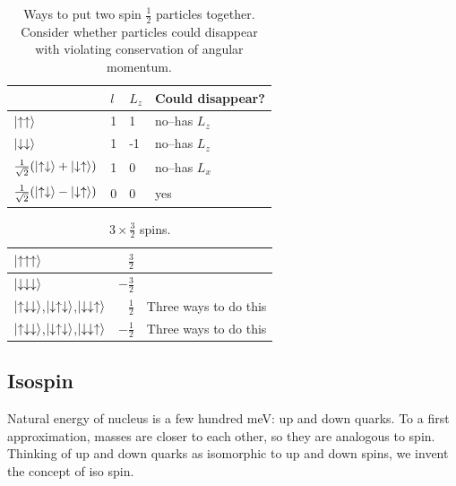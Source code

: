 \documentclass[]{article}
\begin{document}
\begin{table}[H]
	\begin{center}
		\caption[Ways to put two spin $\frac{1}{2}$ particles together]{Ways to put two spin $\frac{1}{2}$ particles together. Consider whether particles could disappear with violating conservation of angular momentum.}
		\begin{tabular}{|l|l|l|l|}\hline
			&$l$&$L_z$&Could disappear?\\ \hline
			$\ket{\uparrow\uparrow}$ &1&1&no--has $L_z$\\ \hline
			$\ket{\downarrow\downarrow}$&1&-1&no--has $L_z$ \\ \hline
			$\frac{1}{\sqrt{2}}(\ket{\uparrow\downarrow}+\ket{\downarrow\uparrow})$ &1&0&no--has $L_x$\\ \hline
			$\frac{1}{\sqrt{2}}(\ket{\uparrow\downarrow}-\ket{\downarrow\uparrow})$ &0&0&yes\\ \hline
		\end{tabular}
	\end{center}
\end{table}


\begin{table}[H]
	\begin{center}
		\caption{$3 \times \frac{3}{2}$ spins.}
		\begin{tabular}{|l|r|c|}\hline
			$\ket{\uparrow\uparrow\uparrow}$&$\frac{3}{2}$& \\ \hline
			$\ket{\downarrow\downarrow\downarrow}$&$-\frac{3}{2}$& \\ \hline
			$\ket{\uparrow\downarrow\downarrow}$,$\ket{\downarrow\uparrow\downarrow}$,$\ket{\downarrow\downarrow\uparrow}$&$\frac{1}{2}$&Three ways to do this\\ \hline
			$\ket{\uparrow\downarrow\downarrow}$,$\ket{\downarrow\uparrow\downarrow}$,$\ket{\downarrow\downarrow\uparrow}$&$-\frac{1}{2}$&Three ways to do this\\ \hline
		\end{tabular}
	\end{center}
\end{table}

\subsection{Isospin}

Natural energy of nucleus is a few hundred meV: up and down quarks. To a first approximation, masses are closer to each other, so they are analogous to spin. Thinking of up and down quarks as isomorphic to up and down spins, we invent the concept of iso spin.
\end{document}
